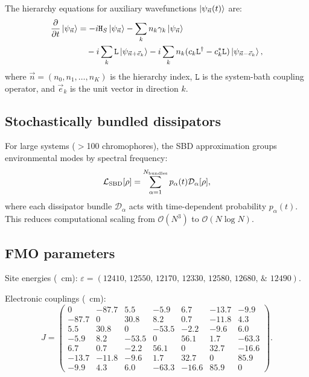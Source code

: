 \documentclass[11pt,a4paper]{article}
\begin{document}
The hierarchy equations for auxiliary wavefunctions $\ket{\psi_{\vec{n}}(t)}$ are:
\begin{align}
\pdv{t}\ket{\psi_{\vec{n}}} &= -i\mathtt{H}_S\ket{\psi_{\vec{n}}} - \sum_k n_k \gamma_k \ket{\psi_{\vec{n}}} \nonumber \\
&\quad - i\sum_k \mathtt{L} \ket{\psi_{\vec{n}+\vec{e}_k}} - i\sum_k n_k (c_k \mathtt{L}^\dagger - c_k^* \mathtt{L}) \ket{\psi_{\vec{n}-\vec{e}_k}},
\end{align}
where $\vec{n} = (n_0, n_1, \dots, n_K)$ is the hierarchy index, $\mathtt{L}$ is the system-bath coupling operator, and $\vec{e}_k$ is the unit vector in direction $k$.

\subsection{Stochastically bundled dissipators}

For large systems ($>$\num{100} chromophores), the SBD approximation groups environmental modes by spectral frequency:
\begin{equation}
\mathcal{L}_{\rm SBD}[\rho] = \sum_{\alpha=1}^{N_{\rm bundles}} p_\alpha(t) \mathcal{D}_\alpha[\rho],
\end{equation}
where each dissipator bundle $\mathcal{D}_\alpha$ acts with time-dependent probability $p_\alpha(t)$. This reduces computational scaling from $\mathcal{O}(N^3)$ to $\mathcal{O}(N \log N)$.

\subsection{FMO parameters}

Site energies (\si{\per\centi\meter}): $\varepsilon = (\numlist{12410; 12550; 12170; 12330; 12580; 12680; 12490})$.

Electronic couplings (\si{\per\centi\meter}):
\begin{equation}
J = \begin{pmatrix}
0 & -87.7 & 5.5 & -5.9 & 6.7 & -13.7 & -9.9 \\
-87.7 & 0 & 30.8 & 8.2 & 0.7 & -11.8 & 4.3 \\
5.5 & 30.8 & 0 & -53.5 & -2.2 & -9.6 & 6.0 \\
-5.9 & 8.2 & -53.5 & 0 & 56.1 & 1.7 & -63.3 \\
6.7 & 0.7 & -2.2 & 56.1 & 0 & 32.7 & -16.6 \\
-13.7 & -11.8 & -9.6 & 1.7 & 32.7 & 0 & 85.9 \\
-9.9 & 4.3 & 6.0 & -63.3 & -16.6 & 85.9 & 0
\end{pmatrix}.
\end{equation}
\end{document}
